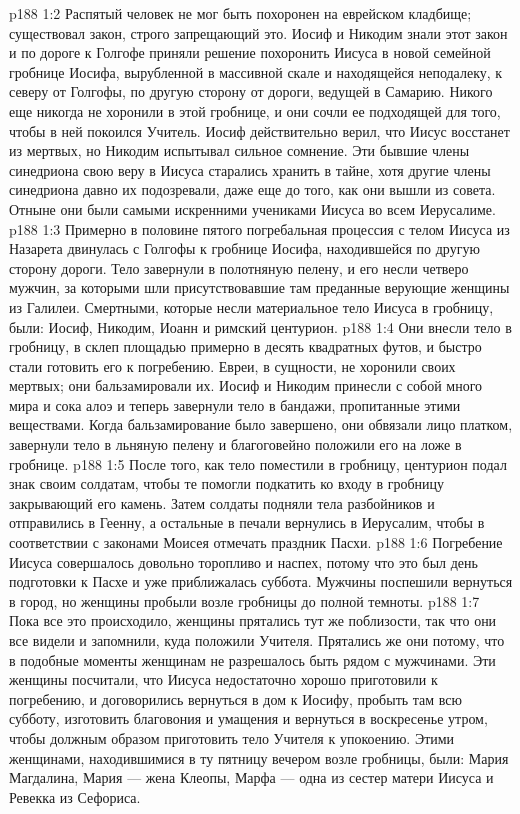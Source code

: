 \vs p188 1:2 Распятый человек не мог быть похоронен на еврейском кладбище; существовал закон, строго запрещающий это. Иосиф и Никодим знали этот закон и по дороге к Голгофе приняли решение похоронить Иисуса в новой семейной гробнице Иосифа, вырубленной в массивной скале и находящейся неподалеку, к северу от Голгофы, по другую сторону от дороги, ведущей в Самарию. Никого еще никогда не хоронили в этой гробнице, и они сочли ее подходящей для того, чтобы в ней покоился Учитель. Иосиф действительно верил, что Иисус восстанет из мертвых, но Никодим испытывал сильное сомнение. Эти бывшие члены синедриона свою веру в Иисуса старались хранить в тайне, хотя другие члены синедриона давно их подозревали, даже еще до того, как они вышли из совета. Отныне они были самыми искренними учениками Иисуса во всем Иерусалиме.
\vs p188 1:3 Примерно в половине пятого погребальная процессия с телом Иисуса из Назарета двинулась с Голгофы к гробнице Иосифа, находившейся по другую сторону дороги. Тело завернули в полотняную пелену, и его несли четверо мужчин, за которыми шли присутствовавшие там преданные верующие женщины из Галилеи. Смертными, которые несли материальное тело Иисуса в гробницу, были: Иосиф, Никодим, Иоанн и римский центурион.
\vs p188 1:4 Они внесли тело в гробницу, в склеп площадью примерно в десять квадратных футов, и быстро стали готовить его к погребению. Евреи, в сущности, не хоронили своих мертвых; они бальзамировали их. Иосиф и Никодим принесли с собой много мира и сока алоэ и теперь завернули тело в бандажи, пропитанные этими веществами. Когда бальзамирование было завершено, они обвязали лицо платком, завернули тело в льняную пелену и благоговейно положили его на ложе в гробнице.
\vs p188 1:5 После того, как тело поместили в гробницу, центурион подал знак своим солдатам, чтобы те помогли подкатить ко входу в гробницу закрывающий его камень. Затем солдаты подняли тела разбойников и отправились в Геенну, а остальные в печали вернулись в Иерусалим, чтобы в соответствии с законами Моисея отмечать праздник Пасхи.
\vs p188 1:6 Погребение Иисуса совершалось довольно торопливо и наспех, потому что это был день подготовки к Пасхе и уже приближалась суббота. Мужчины поспешили вернуться в город, но женщины пробыли возле гробницы до полной темноты.
\vs p188 1:7 Пока все это происходило, женщины прятались тут же поблизости, так что они все видели и запомнили, куда положили Учителя. Прятались же они потому, что в подобные моменты женщинам не разрешалось быть рядом с мужчинами. Эти женщины посчитали, что Иисуса недостаточно хорошо приготовили к погребению, и договорились вернуться в дом к Иосифу, пробыть там всю субботу, изготовить благовония и умащения и вернуться в воскресенье утром, чтобы должным образом приготовить тело Учителя к упокоению. Этими женщинами, находившимися в ту пятницу вечером возле гробницы, были: Мария Магдалина, Мария --- жена Клеопы, Марфа --- одна из сестер матери Иисуса и Ревекка из Сефориса.
